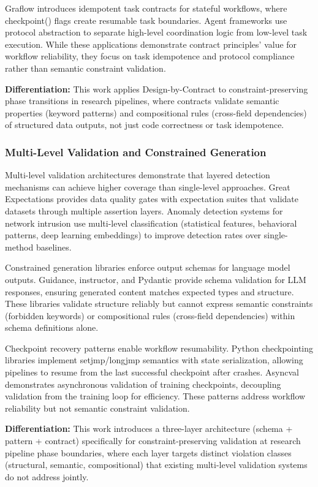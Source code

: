 Graflow introduces idempotent task contracts for stateful workflows, where checkpoint() flags create resumable task boundaries. Agent frameworks use protocol abstraction to separate high-level coordination logic from low-level task execution. While these applications demonstrate contract principles' value for workflow reliability, they focus on task idempotence and protocol compliance rather than semantic constraint validation.

\textbf{Differentiation:} This work applies Design-by-Contract to constraint-preserving phase transitions in research pipelines, where contracts validate semantic properties (keyword patterns) and compositional rules (cross-field dependencies) of structured data outputs, not just code correctness or task idempotence.

\subsubsection{Multi-Level Validation and Constrained Generation}

Multi-level validation architectures demonstrate that layered detection mechanisms can achieve higher coverage than single-level approaches. Great Expectations provides data quality gates with expectation suites that validate datasets through multiple assertion layers. Anomaly detection systems for network intrusion use multi-level classification (statistical features, behavioral patterns, deep learning embeddings) to improve detection rates over single-method baselines.

Constrained generation libraries enforce output schemas for language model outputs. Guidance, instructor, and Pydantic provide schema validation for LLM responses, ensuring generated content matches expected types and structure. These libraries validate structure reliably but cannot express semantic constraints (forbidden keywords) or compositional rules (cross-field dependencies) within schema definitions alone.

Checkpoint recovery patterns enable workflow resumability. Python checkpointing libraries implement setjmp/longjmp semantics with state serialization, allowing pipelines to resume from the last successful checkpoint after crashes. Asyncval demonstrates asynchronous validation of training checkpoints, decoupling validation from the training loop for efficiency. These patterns address workflow reliability but not semantic constraint validation.

\textbf{Differentiation:} This work introduces a three-layer architecture (schema + pattern + contract) specifically for constraint-preserving validation at research pipeline phase boundaries, where each layer targets distinct violation classes (structural, semantic, compositional) that existing multi-level validation systems do not address jointly.

